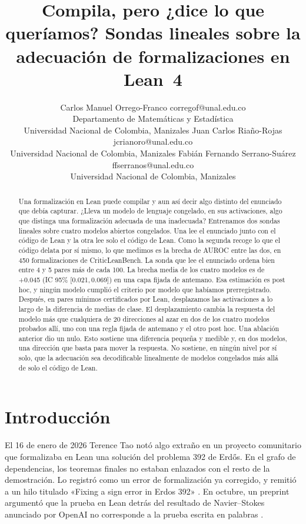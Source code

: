 \documentclass[10pt]{article}
\title{Compila, pero ¿dice lo que queríamos? Sondas lineales sobre la adecuación de formalizaciones en Lean~4}
\author{\name Carlos Manuel Orrego-Franco \email corregof@unal.edu.co \\
      \addr Departamento de Matem\'aticas y Estad\'istica\\
      Universidad Nacional de Colombia, Manizales
      \AND
      \name Juan Carlos Ria\~no-Rojas \email jcrianoro@unal.edu.co \\
      \addr Universidad Nacional de Colombia, Manizales
      \AND
      \name Fabi\'an Fernando Serrano-Su\'arez \email ffserranos@unal.edu.co \\
      \addr Universidad Nacional de Colombia, Manizales}
\newcommand{\ic}[2]{[#1,\,#2]}
\begin{document}
\maketitle

\begin{abstract}
Una formalización en Lean puede compilar y aun así decir algo distinto del enunciado que debía capturar. ¿Lleva un
modelo de lenguaje congelado, en sus activaciones, algo que distinga una formalización adecuada de una inadecuada?
Entrenamos dos sondas lineales sobre cuatro modelos abiertos congelados. Una lee el enunciado junto con el código de
Lean y la otra lee solo el código de Lean. Como la segunda recoge lo que el código delata por sí mismo, lo que medimos
es la brecha de AUROC entre las dos, en 450 formalizaciones de CriticLeanBench. La sonda que lee el enunciado ordena
bien entre 4 y 5 pares más de cada 100. La brecha media de los cuatro modelos es de +0.045 (IC 95\%
\ic{0.021}{0.069}) en una capa fijada de antemano. Esa estimación es post hoc, y ningún modelo cumplió el criterio
por modelo que habíamos prerregistrado. Después, en pares mínimos certificados por Lean, desplazamos las activaciones
a lo largo de la diferencia de medias de clase. El desplazamiento cambia la respuesta del modelo más que cualquiera de
20 direcciones al azar en dos de los cuatro modelos probados allí, uno con una regla fijada de antemano y el otro post
hoc. Una ablación anterior dio un nulo. Esto sostiene una diferencia pequeña y medible y, en dos modelos, una
dirección que basta para mover la respuesta. No sostiene, en ningún nivel por sí solo, que la adecuación sea
decodificable linealmente de modelos congelados más allá de solo el código de Lean.
\end{abstract}

\section{Introducción}

El 16 de enero de 2026 Terence Tao notó algo extraño en un proyecto comunitario que formalizaba en Lean una solución
del problema 392 de Erd\H{o}s. En el grafo de dependencias, los teoremas finales no estaban enlazados con el resto de
la demostración. Lo registró como un error de formalización ya corregido, y remitió a un hilo titulado «Fixing a sign
error in Erdos 392» \citep{tao2026log}. En octubre, un preprint argumentó que la prueba en Lean detrás del resultado de
Navier--Stokes anunciado por OpenAI no corresponde a la prueba escrita en palabras \citep{bastounis2026lost}.
\end{document}

